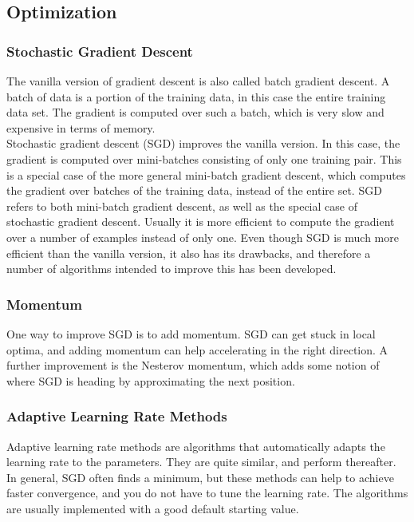 \subsection{Optimization}

\subsubsection{Stochastic Gradient Descent}

The vanilla version of gradient descent is also called batch gradient descent. A batch of data is a portion of the training data, in this case the entire training data set. The gradient is computed over such a batch, which is very slow and expensive in terms of memory. \\

\noindent Stochastic gradient descent (SGD) improves the vanilla version. In this case, the gradient is computed over mini-batches consisting of only one training pair. This is a special case of the more general mini-batch gradient descent, which computes the gradient over batches of the training data, instead of the entire set. SGD refers to both mini-batch gradient descent, as well as the special case of stochastic gradient descent. Usually it is more efficient to compute the gradient over a number of examples instead of only one. Even though SGD is much more efficient than the vanilla version, it also has its drawbacks, and therefore a number of algorithms intended to improve this has been developed.

\subsubsection{Momentum}

One way to improve SGD is to add momentum. SGD can get stuck in local optima, and adding momentum can help accelerating in the right direction. A further improvement is the Nesterov momentum, which adds some notion of where SGD is heading by approximating the next position.

\subsubsection{Adaptive Learning Rate Methods}

Adaptive learning rate methods are algorithms that automatically adapts the learning rate to the parameters. They are quite similar, and perform thereafter. In general, SGD often finds a minimum, but these methods can help to achieve faster convergence, and you do not have to tune the learning rate. The algorithms are usually implemented with a good default starting value. \\

